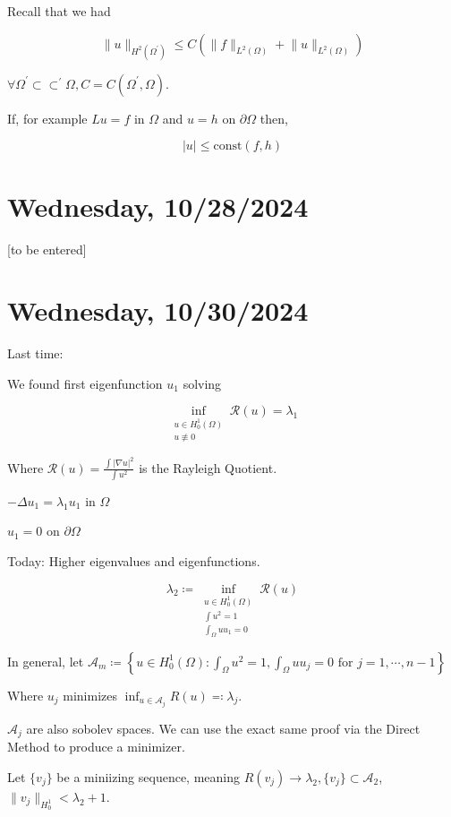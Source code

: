 \documentclass{article}
\theoremstyle{definition}
\begin{document}
Recall that we had

\[
    \lVert u \rVert _{H^2(\Omega^{\prime})} \leq C \left( \lVert f \rVert _{L^2(\Omega)} + \lVert u \rVert _{L^2(\Omega)} \right) 
\]

\(\forall \Omega ^{\prime} \subset \subset ^{\prime} \Omega, C = C(\Omega ^{\prime} , \Omega)\).

If, for example \(L u = f\) in \(\Omega\) and \(u = h\) on \(\partial \Omega\) then,

\[
    \vert u \vert \leq \text{const}(f,h)
\]

\section*{Wednesday, 10/28/2024}

[to be entered]

\section*{Wednesday, 10/30/2024}

Last time:

We found first eigenfunction \(u_1\) solving

\[
    \inf_{\substack{u \in H^1_0(\Omega) \\ u \not\equiv 0}} \mathcal{R}(u) = \lambda_1
\]

Where \(\mathcal{R}(u) = \frac{\int \vert \nabla u \vert ^2}{\int u ^ 2}\) is the Rayleigh Quotient.

\(- \Delta u_1 = \lambda_1 u_1\) in \(\Omega\) 

\(u_1 = 0\) on \(\partial \Omega\) 

Today: Higher eigenvalues and eigenfunctions.

\[
    \lambda_2 \coloneqq \inf_{\substack{u \in H^1_0(\Omega) \\ \int u^2 = 1 \\ \int_\Omega u u_1 = 0}} \mathcal{R}(u)
\]

In general, let \(\mathscr{A}_m \coloneqq \left\{ u \in H^1_0(\Omega) : \int_\Omega u^2 = 1, \int_\Omega u u_j = 0 \text{ for } j = 1, \cdots , n-1 \right\}\)

Where \(u_j\) minimizes \(\inf_{u \in \mathscr{A}_j} R(u) \eqqcolon \lambda_j\).

\(\mathscr{A}_j\) are also sobolev spaces. We can use the exact same proof via the Direct Method to produce a minimizer.

Let \(\{ v_j \}\) be a miniizing sequence, meaning \(R(v_j) \to \lambda_2, \{ v_j \} \subset \mathscr{A}_2\), \(\lVert v_j \rVert _{H^1_0} < \lambda_2  + 1\).
\end{document}
